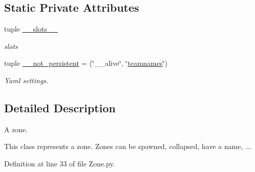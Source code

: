 \subsection*{\-Static \-Private \-Attributes}
\begin{DoxyCompactItemize}
\item 
tuple \hyperlink{class_zone_1_1_zone_ad7d13498103aed8ebf8f3bb4e3344167}{\-\_\-\-\_\-slots\-\_\-\-\_\-}
\begin{DoxyCompactList}\small\item\em slots \end{DoxyCompactList}\item 
tuple \hyperlink{class_zone_1_1_zone_ab2019c4e9195c823578aa92959b5d5c5}{\-\_\-\-\_\-not\-\_\-persistent} = (\char`\"{}\-\_\-\-\_\-alive\char`\"{}, \char`\"{}\hyperlink{class_zone_1_1_zone_afcd2a65c9302b856a12d532f868e8cab}{teamnames}\char`\"{})
\begin{DoxyCompactList}\small\item\em \-Yaml settings. \end{DoxyCompactList}\end{DoxyCompactItemize}


\subsection{\-Detailed \-Description}
\-A zone. 

\-This class represents a zone. \-Zones can be spawned, collapsed, have a name, ... 

\-Definition at line 33 of file \-Zone.\-py.



